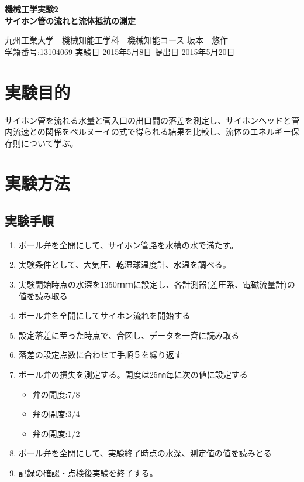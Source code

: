 \documentclass[a4j,twoside,openright,11pt]{jarticle}
\begin{document}
\begin{screen}
\huge
\begin{center}
{\bf 機械工学実験2\\サイホン管の流れと流体抵抗の測定}\\
\end{center}

\normalsize
\begin{flushright}
九州工業大学　機械知能工学科　機械知能コース  坂本　悠作\\学籍番号:13104069 \hspace{0.2in}実験日 2015年5月8日  提出日 2015年5月20日
\end{flushright}
\end{screen}


\section{実験目的}
サイホン管を流れる水量と菅入口の出口間の落差を測定し、サイホンヘッドと管内流速との関係をベルヌーイの式で得られる結果を比較し、流体のエネルギー保存則について学ぶ。
\section{実験方法}
\subsection{実験手順}
\begin{enumerate}
\item ボール弁を全開にして、サイホン管路を水槽の水で満たす。
\item 実験条件として、大気圧、乾湿球温度計、水温を調べる。
\item 実験開始時点の水深を1350ｍｍに設定し、各計測器(差圧系、電磁流量計)の値を読み取る
\item ボール弁を全開にしてサイホン流れを開始する
\item 設定落差に至った時点で、合図し、データを一斉に読み取る
\item 落差の設定点数に合わせて手順５を繰り返す
\item ボール弁の損失を測定する。開度は25㎜毎に次の値に設定する
\begin{itemize}
\item 弁の開度:7/8
\item 弁の開度:3/4
\item 弁の開度:1/2
\end{itemize}
\item ボール弁を全閉にして、実験終了時点の水深、測定値の値を読みとる
\item 記録の確認・点検後実験を終了する。
\end{enumerate}
\end{document}

